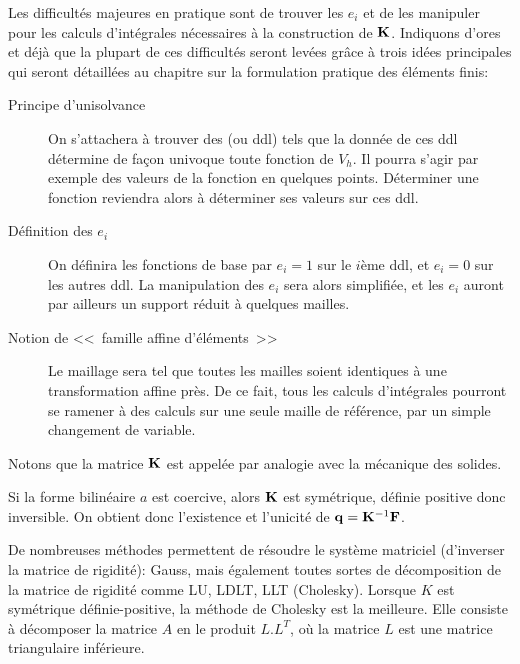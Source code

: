 \medskip
Les difficultés majeures en pratique sont de trouver les $e_i$ et de les manipuler
pour les calculs d'intégrales nécessaires à la construction de $\MM{K}$.
Indiquons d'ores et déjà que la plupart de ces difficultés seront levées
grâce à trois idées principales qui seront détaillées au chapitre sur
la formulation pratique des éléments finis:
\begin{description}
 \item[Principe d'unisolvance]

	On s'attachera à trouver des  (ou
	ddl) tels que la donnée de ces ddl détermine de façon univoque
	toute fonction de $V_h$.
	Il pourra s'agir par exemple des valeurs de la fonction en quelques points.
	Déterminer une fonction reviendra alors à déterminer ses valeurs sur ces ddl.
  \item[Définition des $e_i$]

	On définira les fonctions de base par $e_i = 1$ sur le $i$ème ddl, et
	$e_i = 0$ sur les autres ddl.
	La manipulation des $e_i$ sera alors simplifiée, et les $e_i$
	auront par ailleurs un support réduit à quelques mailles.

	\item[Notion de <<~famille affine d'éléments~>>]

	Le maillage sera tel que toutes les mailles soient identiques à une
	transformation affine près.
	De ce fait, tous les calculs d'intégrales pourront se ramener à
	des calculs sur une seule maille de référence, par un simple changement
	de variable.
\end{description}
\medskip
Notons que la matrice $\MM{K}$ est appelée  par
analogie avec la mécanique des solides.

\medskip
Si la forme bilinéaire $a$ est coercive, alors $\MM{K}$ est symétrique, définie positive
donc inversible. On obtient donc l'existence et l'unicité de $\VV{q} = \MMI{K}\VV{F}$.

De nombreuses méthodes permettent de résoudre le système matriciel (d'inverser la
matrice de rigidité): Gauss, mais également 
toutes sortes de décomposition de la matrice de rigidité comme LU, LDLT, LLT (Cholesky).
Lorsque $K$ est symétrique définie-positive, la méthode de Cholesky
est la meilleure. Elle consiste à décomposer la matrice $A$ en le produit $L.L^T$,
où la matrice $L$ est une matrice triangulaire inférieure.


